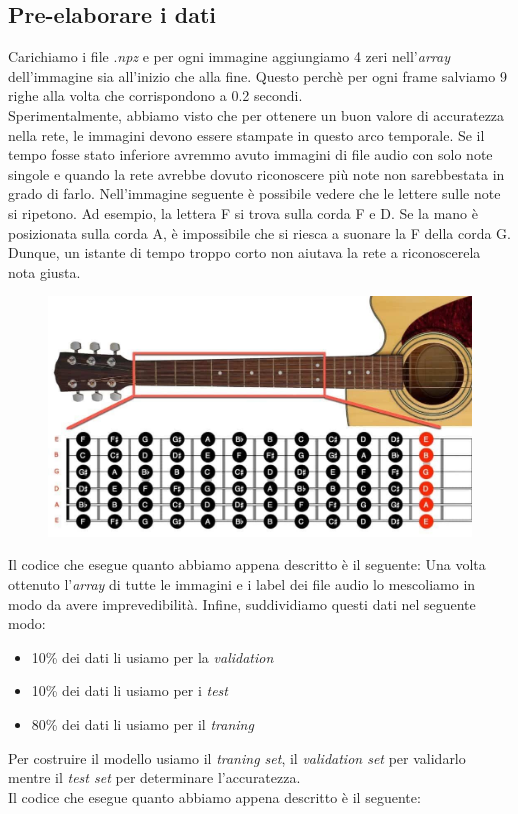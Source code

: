 \subsection{Pre-elaborare i dati}
Carichiamo i file .\textit{npz} e per ogni immagine aggiungiamo 4 zeri nell'\textit{array} dell'immagine sia all'inizio che alla fine. Questo perchè per ogni frame salviamo 9 righe alla volta che corrispondono a 0.2 secondi.\\
Sperimentalmente, abbiamo visto che per ottenere un buon valore di accuratezza nella rete, le immagini devono essere stampate in questo arco temporale. Se il tempo fosse stato inferiore avremmo avuto immagini di file audio con solo note singole e quando la rete avrebbe dovuto riconoscere più note non sarebbestata in grado di farlo.  Nell’immagine seguente è possibile vedere che le lettere sulle note si ripetono.  Ad esempio, la lettera F si trova sulla corda F e D. Se la mano è posizionata sulla corda A, è impossibile che si riesca a suonare la F della corda G. Dunque, un istante di tempo troppo corto non aiutava la rete a riconoscerela nota giusta.
\begin{figure}[H]
	\centering
	\includegraphics[scale=0.30]{./images/img12.jpg}
\end{figure}
Il codice che esegue quanto abbiamo appena descritto è il seguente:
\vspace*{2ex}
\vspace*{2ex}
Una volta ottenuto l'\textit{array} di tutte le immagini e i label dei file audio lo mescoliamo in modo da avere imprevedibilità. Infine, suddividiamo questi dati nel seguente modo:
\begin{itemize}
	\item 10\% dei dati li usiamo per la \textit{validation}
	\item 10\% dei dati li usiamo per i \textit{test}
	\item 80\% dei dati li usiamo per il \textit{traning}
\end{itemize}
Per costruire il modello usiamo il \textit{traning set}, il \textit{validation set} per validarlo mentre il \textit{test set} per determinare l'accuratezza.\\
\newline
Il codice che esegue quanto abbiamo appena descritto è il seguente:
\vspace*{2ex}
\vspace*{2ex}
